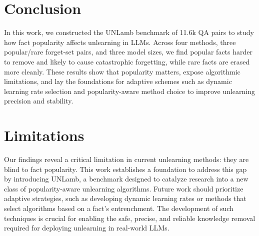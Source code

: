 \section{Conclusion}
In this work, we constructed the UNLamb benchmark of 11.6k QA pairs to study how fact popularity affects unlearning in LLMs. Across four methods, three popular/rare forget-set pairs, and three model sizes, we find popular facts harder to remove and likely to cause catastrophic forgetting, while rare facts are erased more cleanly. These results show that popularity matters, expose algorithmic limitations, and lay the foundations for adaptive schemes such as dynamic learning rate selection and popularity-aware method choice to improve unlearning precision and stability.





\section{Limitations}
Our findings reveal a critical limitation in current unlearning methods: they are blind to fact popularity. This work establishes a foundation to address this gap by introducing UNLamb, a benchmark designed to catalyze research into a new class of popularity-aware unlearning algorithms. Future work should prioritize adaptive strategies, such as developing dynamic learning rates or methods that select algorithms based on a fact's entrenchment. The development of such techniques is crucial for enabling the safe, precise, and reliable knowledge removal required for deploying unlearning in real-world LLMs.

